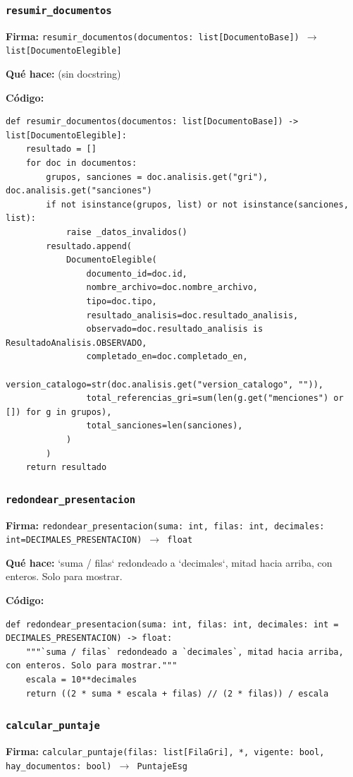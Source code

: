 \documentclass[11pt,a4paper]{article}
\begin{document}
\subsubsection*{\texttt{resumir\_documentos}}
\textbf{Firma:} \texttt{resumir\_documentos(documentos: list[DocumentoBase]) $\rightarrow$ list[DocumentoElegible]}

\textbf{Qué hace:} (sin docstring)

\textbf{Código:}
\begin{lstlisting}
def resumir_documentos(documentos: list[DocumentoBase]) -> list[DocumentoElegible]:
    resultado = []
    for doc in documentos:
        grupos, sanciones = doc.analisis.get("gri"), doc.analisis.get("sanciones")
        if not isinstance(grupos, list) or not isinstance(sanciones, list):
            raise _datos_invalidos()
        resultado.append(
            DocumentoElegible(
                documento_id=doc.id,
                nombre_archivo=doc.nombre_archivo,
                tipo=doc.tipo,
                resultado_analisis=doc.resultado_analisis,
                observado=doc.resultado_analisis is ResultadoAnalisis.OBSERVADO,
                completado_en=doc.completado_en,
                version_catalogo=str(doc.analisis.get("version_catalogo", "")),
                total_referencias_gri=sum(len(g.get("menciones") or []) for g in grupos),
                total_sanciones=len(sanciones),
            )
        )
    return resultado
\end{lstlisting}

\subsubsection*{\texttt{redondear\_presentacion}}
\textbf{Firma:} \texttt{redondear\_presentacion(suma: int, filas: int, decimales: int=DECIMALES\_PRESENTACION) $\rightarrow$ float}

\textbf{Qué hace:} `suma / filas` redondeado a `decimales`, mitad hacia arriba, con enteros. Solo para mostrar.

\textbf{Código:}
\begin{lstlisting}
def redondear_presentacion(suma: int, filas: int, decimales: int = DECIMALES_PRESENTACION) -> float:
    """`suma / filas` redondeado a `decimales`, mitad hacia arriba, con enteros. Solo para mostrar."""
    escala = 10**decimales
    return ((2 * suma * escala + filas) // (2 * filas)) / escala
\end{lstlisting}

\subsubsection*{\texttt{calcular\_puntaje}}
\textbf{Firma:} \texttt{calcular\_puntaje(filas: list[FilaGri], *, vigente: bool, hay\_documentos: bool) $\rightarrow$ PuntajeEsg}
\end{document}
